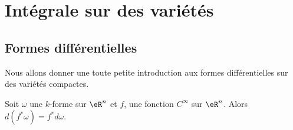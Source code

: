 \section{Intégrale sur des variétés}

\subsection{Formes différentielles}

Nous allons donner une toute petite introduction aux formes différentielles sur des variétés compactes.

\begin{lemma}       \label{LemdwLGFG}
	Soit \( \omega\) une \( k\)-forme sur \( \eR^n\) et \( f\), une fonction \( C^{\infty}\) sur \( \eR^n\). Alors \( d(f^*\omega)=f^*d\omega\).
\end{lemma}

